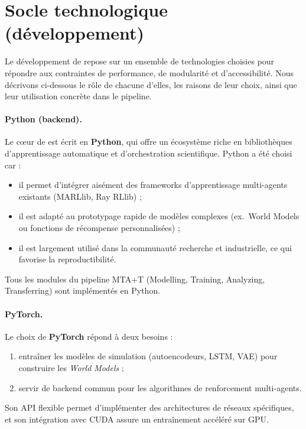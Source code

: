 \section{Socle technologique (développement)}\label{sec:cybmasde_tech_stack}

Le développement de  repose sur un ensemble de technologies choisies pour répondre aux contraintes de performance, de modularité et d'accessibilité.
Nous décrivons ci-dessous le rôle de chacune d'elles, les raisons de leur choix, ainsi que leur utilisation concrète dans le pipeline.

\paragraph{Python (backend).}
Le cœur de  est écrit en \textbf{Python}, qui offre un écosystème riche en bibliothèques d'apprentissage automatique et d'orchestration scientifique. Python a été choisi car :
\begin{itemize}
  \item il permet d'intégrer aisément des frameworks d'apprentissage multi-agents existants (MARLlib, Ray RLlib) ;
  \item il est adapté au prototypage rapide de modèles complexes (ex.~World Models ou fonctions de récompense personnalisées) ;
  \item il est largement utilisé dans la communauté recherche et industrielle, ce qui favorise la reproductibilité.
\end{itemize}
Tous les modules du pipeline MTA+T (Modelling, Training, Analyzing, Transferring) sont implémentés en Python.

\paragraph{PyTorch.}
Le choix de \textbf{PyTorch} répond à deux besoins :
\begin{enumerate}
  \item entraîner les modèles de simulation (autoencodeurs, LSTM, VAE) pour construire les \textit{World Models} ;
  \item servir de backend commun pour les algorithmes de renforcement multi-agents.
\end{enumerate}
Son API flexible permet d'implémenter des architectures de réseaux spécifiques, et son intégration avec CUDA assure un entraînement accéléré sur GPU.

